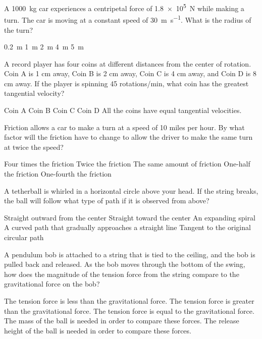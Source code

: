 \documentclass{../../../oss-ap12ibhl}
\begin{document}
\genheader


\begin{questions}
  
  \question A \SI{1000}{\kilo\gram} car experiences a centripetal force of
  \SI{1.8e5}{\newton} while making a turn. The car is moving at a constant
  speed of \SI{30}{\metre\per\second}. What is the radius of the turn?
  \begin{choices}
    \choice\SI{.2}{\metre}
    \choice\SI{1}{\metre}
    \choice\SI{2}{\metre}
    \choice\SI{4}{\metre}
    \choice\SI{5}{\metre}
  \end{choices}

  \question A record player has four coins at different distances from the
  center of rotation. Coin A is 1 cm away, Coin B is 2 cm away, Coin C is 4 cm
  away, and Coin D is 8 cm away. If the player is spinning 45 rotations/min,
  what coin has the greatest tangential velocity?
  \begin{choices}
    \choice Coin A
    \choice Coin B
    \choice Coin C
    \choice Coin D
    \choice All the coins have equal tangential velocities.
  \end{choices}

  \question Friction allows a car to make a turn at a speed of 10 miles per
  hour. By what factor will the friction have to change to allow the driver to
  make the same turn at twice the speed?
  \begin{choices}
    \choice Four times the friction
    \choice Twice the friction
    \choice The same amount of friction
    \choice One-half the friction
    \choice One-fourth the friction
  \end{choices}

  \question A tetherball is whirled in a horizontal circle above your head. If
  the string breaks, the ball will follow what type of path if it is observed
  from above?
  \begin{choices}
    \choice Straight outward from the center
    \choice Straight toward the center
    \choice An expanding spiral
    \choice A curved path that gradually approaches a straight line
    \choice Tangent to the original circular path
  \end{choices}

  \question A pendulum bob is attached to a string that is tied to the ceiling,
  and the bob is pulled back and released. As the bob moves through the bottom
  of the swing, how does the magnitude of the tension force from the string
  compare to the gravitational force on the bob?
  \begin{choices}
    \choice The tension force is less than the gravitational force.
    \choice The tension force is greater than the gravitational force.
    \choice The tension force is equal to the gravitational force.
    \choice The mass of the ball is needed in order to compare these forces.
    \choice The release height of the ball is needed in order to compare these
    forces.
  \end{choices}


\end{questions}
\end{document}
